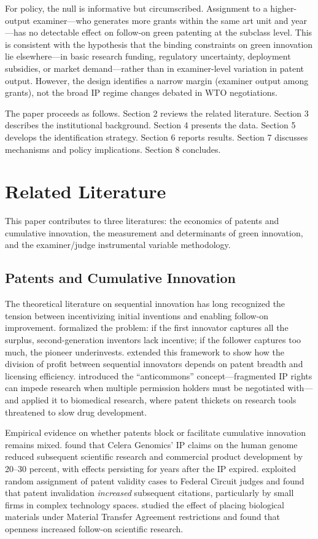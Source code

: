 \documentclass[12pt]{article}
\begin{document}
For policy, the null is informative but circumscribed. Assignment to a higher-output examiner---who generates more grants within the same art unit and year---has no detectable effect on follow-on green patenting at the subclass level. This is consistent with the hypothesis that the binding constraints on green innovation lie elsewhere---in basic research funding, regulatory uncertainty, deployment subsidies, or market demand---rather than in examiner-level variation in patent output. However, the design identifies a narrow margin (examiner output among grants), not the broad IP regime changes debated in WTO negotiations.

The paper proceeds as follows. Section 2 reviews the related literature. Section 3 describes the institutional background. Section 4 presents the data. Section 5 develops the identification strategy. Section 6 reports results. Section 7 discusses mechanisms and policy implications. Section 8 concludes.


\section{Related Literature}

This paper contributes to three literatures: the economics of patents and cumulative innovation, the measurement and determinants of green innovation, and the examiner/judge instrumental variable methodology.

\subsection{Patents and Cumulative Innovation}

The theoretical literature on sequential innovation has long recognized the tension between incentivizing initial inventions and enabling follow-on improvement. \citet{scotchmer1991} formalized the problem: if the first innovator captures all the surplus, second-generation inventors lack incentive; if the follower captures too much, the pioneer underinvests. \citet{green2019} extended this framework to show how the division of profit between sequential innovators depends on patent breadth and licensing efficiency. \citet{heller1998} introduced the ``anticommons'' concept---fragmented IP rights can impede research when multiple permission holders must be negotiated with---and applied it to biomedical research, where patent thickets on research tools threatened to slow drug development.

Empirical evidence on whether patents block or facilitate cumulative innovation remains mixed. \citet{williams2013} found that Celera Genomics' IP claims on the human genome reduced subsequent scientific research and commercial product development by 20--30 percent, with effects persisting for years after the IP expired. \citet{galasso2015} exploited random assignment of patent validity cases to Federal Circuit judges and found that patent invalidation \emph{increased} subsequent citations, particularly by small firms in complex technology spaces. \citet{murray2007} studied the effect of placing biological materials under Material Transfer Agreement restrictions and found that openness increased follow-on scientific research.
\end{document}
